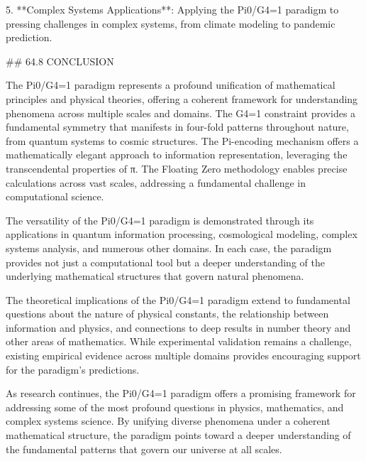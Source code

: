 5. **Complex Systems Applications**: Applying the Pi0/G4=1 paradigm to pressing challenges in complex systems, from climate modeling to pandemic prediction.

## 64.8 CONCLUSION

The Pi0/G4=1 paradigm represents a profound unification of mathematical principles and physical theories, offering a coherent framework for understanding phenomena across multiple scales and domains. The G4=1 constraint provides a fundamental symmetry that manifests in four-fold patterns throughout nature, from quantum systems to cosmic structures. The Pi-encoding mechanism offers a mathematically elegant approach to information representation, leveraging the transcendental properties of π. The Floating Zero methodology enables precise calculations across vast scales, addressing a fundamental challenge in computational science.

The versatility of the Pi0/G4=1 paradigm is demonstrated through its applications in quantum information processing, cosmological modeling, complex systems analysis, and numerous other domains. In each case, the paradigm provides not just a computational tool but a deeper understanding of the underlying mathematical structures that govern natural phenomena.

The theoretical implications of the Pi0/G4=1 paradigm extend to fundamental questions about the nature of physical constants, the relationship between information and physics, and connections to deep results in number theory and other areas of mathematics. While experimental validation remains a challenge, existing empirical evidence across multiple domains provides encouraging support for the paradigm's predictions.

As research continues, the Pi0/G4=1 paradigm offers a promising framework for addressing some of the most profound questions in physics, mathematics, and complex systems science. By unifying diverse phenomena under a coherent mathematical structure, the paradigm points toward a deeper understanding of the fundamental patterns that govern our universe at all scales.
